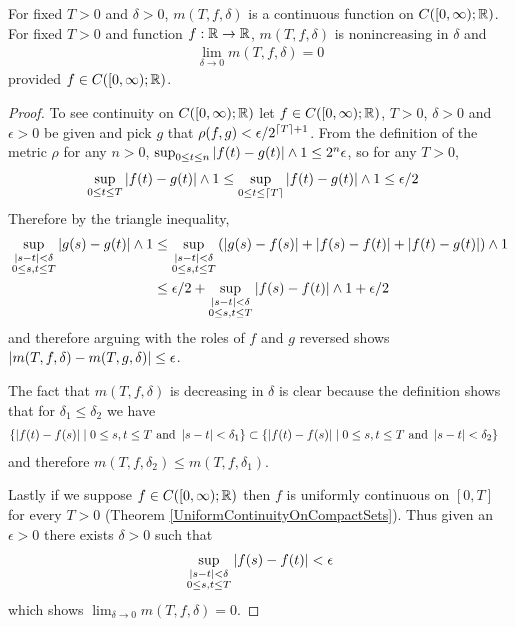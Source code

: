 \begin{lem}For fixed $T > 0$ and $\delta > 0$, $m(T, f, \delta)$ is a
  continuous function on $C([0,\infty); \mathbb{R})$.  For fixed $T > 0$
  and function $f : \mathbb{R} \to \mathbb{R}$, $m(T,f,\delta)$ is
  nonincreasing in $\delta$ and 
\begin{align*}
\lim_{\delta \to 0} m(T, f, \delta) = 0
\end{align*}
provided $f \in C([0,\infty); \mathbb{R})$.
\end{lem}
\begin{proof}
To see continuity on $C([0,\infty); \mathbb{R})$ let $f \in C([0,\infty);
\mathbb{R})$, $T > 0$, $\delta > 0$ and $\epsilon > 0$ be given and pick $g$ that $\rho(f,g) <
\epsilon/2^{\lceil T \rceil+1}$.
From the definition of the metric $\rho$ for any $n > 0$, $\sup_{0 \leq t \leq n} \left \vert f(t) - g(t) \right \vert \wedge
1 \leq 2^n \epsilon$, so for any $T > 0$, 
\begin{align*}
\sup_{0 \leq t \leq T} \left \vert f(t) - g(t) \right \vert \wedge
1 &\leq \sup_{0 \leq t \leq \lceil T \rceil} \left \vert f(t) - g(t) \right \vert \wedge
1 \leq \epsilon/2
\end{align*}  
Therefore by the triangle inequality,
\begin{align*}
\sup_{\substack{
\left \vert s -t \right \vert < \delta \\
0 \leq s,t \leq T}} \left \vert g(s) - g(t) \right \vert \wedge 1 
&\leq 
\sup_{\substack{
\left \vert s -t \right \vert < \delta \\
0 \leq s,t \leq T}} \left ( \left \vert g(s) - f(s) \right \vert + \left \vert f(s) - f(t) \right \vert + \left \vert f(t)
- g(t) \right \vert \right ) \wedge 1 \\
&\leq \epsilon/2 + 
\sup_{\substack{
\left \vert s -t \right \vert < \delta \\
0 \leq s,t \leq T}} \left \vert f(s) - f(t) \right \vert \wedge 1 + \epsilon/2
\end{align*}
and therefore arguing with the roles of $f$ and $g$ reversed shows 
$\left \vert m(T, f, \delta) - m(T, g, \delta)  \right \vert \leq \epsilon$.

The fact that $m(T, f, \delta)$ is decreasing in $\delta$ is clear
because the definition shows that for $\delta_1 \leq \delta_2$ we
have 
\begin{align*}
\lbrace \left \vert f(t) - f(s)  \right \vert \mid 0 \leq s,t \leq T \text{ and }
  \left \vert s-t \right \vert < \delta_1 \rbrace 
&\subset 
\lbrace \left \vert f(t) - f(s)  \right \vert \mid 0 \leq s,t \leq T \text{ and }
  \left \vert s-t \right \vert < \delta_2 \rbrace
\end{align*} and therefore $m(T, f, \delta_2) \leq
  m(T, f, \delta_1)$.

Lastly if we suppose $f \in C([0,\infty); \mathbb{R})$ then $f$ is
uniformly continuous on $[0,T]$ for every $T > 0$ (Theorem
\ref{UniformContinuityOnCompactSets}).  Thus given an $\epsilon > 0$
there exists $\delta>0$ such that 
\begin{align*}
\sup_{\substack{
\left \vert s -t \right \vert < \delta \\
0 \leq s,t \leq T}} \left \vert f(s) - f(t) \right \vert < \epsilon
\end{align*}
which shows $\lim_{\delta \to 0} m(T, f, \delta) = 0$.
\end{proof}
